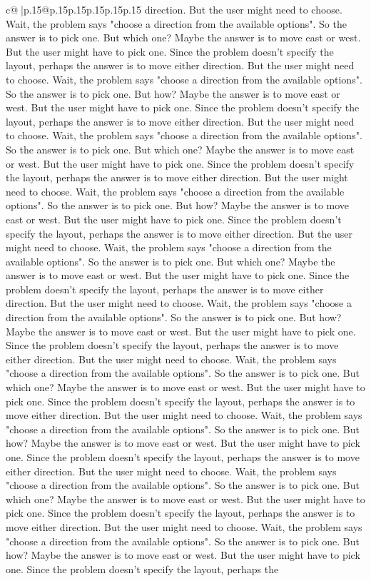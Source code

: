 \documentclass{article}
\begin{document}
{\begin{supertabular}{c@{$\;$}|p{.15\linewidth}@{}p{.15\linewidth}p{.15\linewidth}p{.15\linewidth}p{.15\linewidth}p{.15\linewidth}}
{{{direction. But the user might need to choose. Wait, the problem says "choose a direction from the available options". So the answer is to pick one. But which one? Maybe the answer is to move east or west. But the user might have to pick one. Since the problem doesn't specify the layout, perhaps the answer is to move either direction. But the user might need to choose. Wait, the problem says "choose a direction from the available options". So the answer is to pick one. But how? Maybe the answer is to move east or west. But the user might have to pick one. Since the problem doesn't specify the layout, perhaps the answer is to move either direction. But the user might need to choose. Wait, the problem says "choose a direction from the available options". So the answer is to pick one. But which one? Maybe the answer is to move east or west. But the user might have to pick one. Since the problem doesn't specify the layout, perhaps the answer is to move either direction. But the user might need to choose. Wait, the problem says "choose a direction from the available options". So the answer is to pick one. But how? Maybe the answer is to move east or west. But the user might have to pick one. Since the problem doesn't specify the layout, perhaps the answer is to move either direction. But the user might need to choose. Wait, the problem says "choose a direction from the available options". So the answer is to pick one. But which one? Maybe the answer is to move east or west. But the user might have to pick one. Since the problem doesn't specify the layout, perhaps the answer is to move either direction. But the user might need to choose. Wait, the problem says "choose a direction from the available options". So the answer is to pick one. But how? Maybe the answer is to move east or west. But the user might have to pick one. Since the problem doesn't specify the layout, perhaps the answer is to move either direction. But the user might need to choose. Wait, the problem says "choose a direction from the available options". So the answer is to pick one. But which one? Maybe the answer is to move east or west. But the user might have to pick one. Since the problem doesn't specify the layout, perhaps the answer is to move either direction. But the user might need to choose. Wait, the problem says "choose a direction from the available options". So the answer is to pick one. But how? Maybe the answer is to move east or west. But the user might have to pick one. Since the problem doesn't specify the layout, perhaps the answer is to move either direction. But the user might need to choose. Wait, the problem says "choose a direction from the available options". So the answer is to pick one. But which one? Maybe the answer is to move east or west. But the user might have to pick one. Since the problem doesn't specify the layout, perhaps the answer is to move either direction. But the user might need to choose. Wait, the problem says "choose a direction from the available options". So the answer is to pick one. But how? Maybe the answer is to move east or west. But the user might have to pick one. Since the problem doesn't specify the layout, perhaps the }}}
\end{supertabular}}
\end{document}
